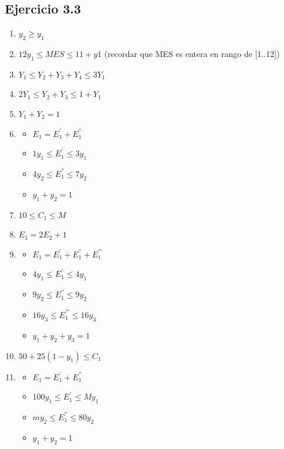 \documentclass[12pt]{book}
\begin{document}
\subsection{Ejercicio 3.3}
\begin{enumerate}[a]


\item \quad $ y_2 \geq y_1$
\item \quad $ 12 y_1 \leq MES \leq 11 + y1$ (recordar que MES es entera en rango de [1..12])
\item \quad $ Y_1 \leq Y_2 + Y_3 + Y_4 \leq 3Y_1 $ 
\item \quad $ 2Y_1 \leq Y_2 + Y_3 \leq 1 + Y_1 $ 
\item \quad $ Y_1 + Y_2 = 1 $ 
\item 
	\begin{itemize}
	\item $ E_1 =  E_1^{'} +  E_1^{''}  $
	\item $ 1 y_1 \leq E_1^{'} \leq 3 y_1 $
	\item $ 4 y_2 \leq E_1^{''} \leq 7 y_2$
	\item $ y_1 + y_2 = 1$
	\end{itemize}
\item \quad $ 10  \leq C_1 \leq M  $ 
\item \quad $ E_1 = 2 E_2 + 1$ 
\item
	\begin{itemize}
	\item $ E_1 =  E_1^{'} +  E_1^{''}  +  E_1^{'''}  $
	\item $ 4 y_1 \leq E_1^{'} \leq 4 y_1 $
	\item $ 9 y_2 \leq E_1^{''} \leq 9 y_2$
	\item $ 16 y_3 \leq E_1^{'''} \leq 16 y_3$	
	\item $ y_1 + y_2 +y_3= 1$
	\end{itemize}
\item \quad $ 50 + 25(1-y_1)\leq C_1 $
\item 
	\begin{itemize}
	\item $ E_1 =  E_1^{'} +  E_1^{''}$
	\item $ 100 y_1 \leq E_1^{'} \leq M y_1 $
	\item $ m y_2 \leq E_1^{''} \leq 80 y_2$
	\item $ y_1 + y_2 = 1$
	\end{itemize}
\end{enumerate}
\end{document}
